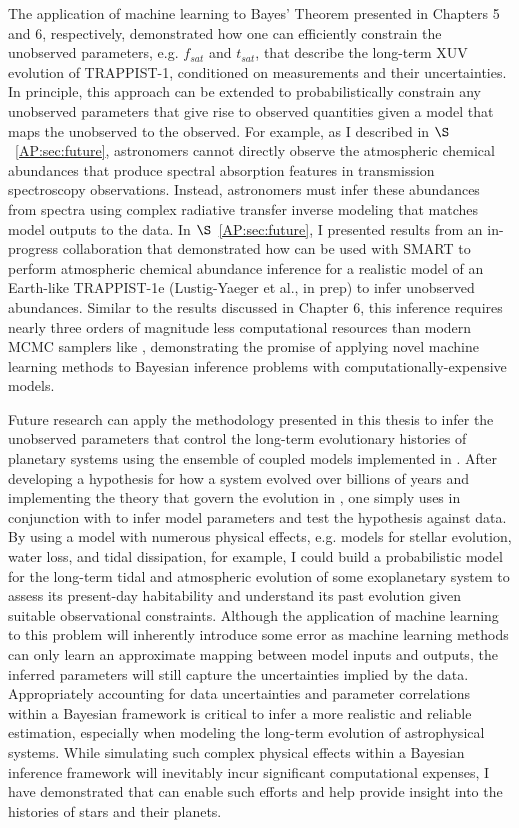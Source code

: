 The application of machine learning to Bayes' Theorem presented in Chapters 5 and 6, respectively, demonstrated how one can efficiently constrain the unobserved parameters, e.g. $f_{sat}$ and $t_{sat}$, that describe the long-term XUV evolution of TRAPPIST-1, conditioned on measurements and their uncertainties. In principle, this approach can be extended to probabilistically constrain any unobserved parameters that give rise to observed quantities given a model that maps the unobserved to the observed. For example, as I described in $\S$~\ref{AP:sec:future}, astronomers cannot directly observe the atmospheric chemical abundances that produce spectral absorption features in transmission spectroscopy observations. Instead, astronomers must infer these abundances from spectra using complex radiative transfer inverse modeling that matches model outputs to the data. In $\S$~\ref{AP:sec:future}, I presented results from an in-progress collaboration that demonstrated how \approxposterior can be used with SMART \citep{Meadows1996,Crisp1997} to perform atmospheric chemical abundance inference for a realistic model of an Earth-like TRAPPIST-1e (Lustig-Yaeger et al., in prep) to infer unobserved abundances. Similar to the results discussed in Chapter 6, this inference requires nearly three orders of magnitude less computational resources than modern MCMC samplers like \emcee, demonstrating the promise of applying novel machine learning methods to Bayesian inference problems with computationally-expensive models.

Future research can apply the methodology presented in this thesis to infer the unobserved parameters that control the long-term evolutionary histories of planetary systems using the ensemble of coupled models implemented in \vplanet. After developing a hypothesis for how a system evolved over billions of years and implementing the theory that govern the evolution in \vplanet, one simply uses \vplanet in conjunction with \approxposterior to infer model parameters and test the hypothesis against data. By using a model with numerous physical effects, e.g. models for stellar evolution, water loss, and tidal dissipation, for example, I could build a probabilistic model for the long-term tidal and atmospheric evolution of some exoplanetary system to assess its present-day habitability and understand its past evolution given suitable observational constraints. Although the application of machine learning to this problem will inherently introduce some error as machine learning methods can only learn an approximate mapping between model inputs and outputs, the inferred parameters will still capture the uncertainties implied by the data. Appropriately accounting for data uncertainties and parameter correlations within a Bayesian framework is critical to infer a more realistic and reliable estimation, especially when modeling the long-term evolution of astrophysical systems. While simulating such complex physical effects within a Bayesian inference framework will inevitably incur significant computational expenses, I have demonstrated that \approxposterior can enable such efforts and help provide insight into the histories of stars and their planets.
